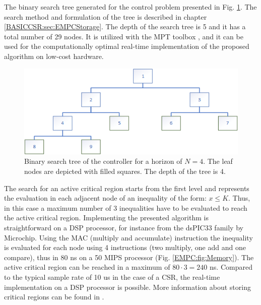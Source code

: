     The binary search tree generated for the control problem presented in Fig. \ref{EMPC:fig:SearchTree}. The search method and formulation of the tree is described in chapter \ref{BASICCSR:sec:EMPCStorage}. The depth of the search tree is 5 and it has a total number of 29 nodes. It is utilized with the MPT toolbox \cite{MPT3}, and it can be used for the computationally optimal real-time implementation of the proposed algorithm on low-cost hardware.

    \begin{figure}[!ht]
        \centering
        \includegraphics[width=\textwidth]{EMPC_PNG_Pics/Tree_normal.png}
        \caption{Binary search tree of the controller for a horizon of $N = 4$. The leaf nodes are depicted with filled squares. The depth of the tree is 4.}
        \label{EMPC:fig:SearchTree}
    \end{figure}

    The search for an active critical region starts from the first level and represents the evaluation in each adjacent node of an inequality of the form: $x\leq K$. Thus, in this case a maximum number of 3 inequalities have to be evaluated to reach the active critical region. Implementing the presented algorithm is straightforward on a DSP processor, for instance from the dsPIC33 family by Microchip. Using the MAC (multiply and accumulate) instruction the inequality is evaluated for each node using 4 instructions (two multiply, one add and one compare), thus in 80 ns on a 50 MIPS processor (Fig. \ref{EMPC:fig:Memory}). The active critical region can be reached in a maximum of $80\cdot3=240$ ns. Compared to the typical sample rate of 10 us in the case of a CSR, the real-time implementation on a DSP processor is possible. More information about storing critical regions can be found in .

